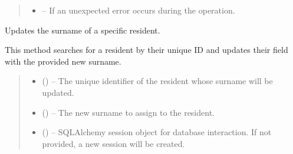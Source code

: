 \documentclass[letterpaper,10pt,english]{sphinxmanual}
\begin{document}
\begin{fulllineitems}
\begin{fulllineitems}
\begin{quote}
\begin{description}
\begin{itemize}
\item {} 
\sphinxAtStartPar
{} – If an unexpected error occurs during the operation.

\end{itemize}

\end{description}\end{quote}

\end{fulllineitems}


\begin{fulllineitems}
\label{\detokenize{app.controllers:app.controllers.resident_controller.ResidentController.updateResidentSurname}}
\pysigstartsignatures
\pysiglinewithargsret
{}
{\sphinxparamcomma {}\sphinxparamcomma {}}
{}
\pysigstopsignatures
\sphinxAtStartPar
Updates the surname of a specific resident.

\sphinxAtStartPar
This method searches for a resident by their unique ID and updates their  field
with the provided new surname.
\begin{quote}\begin{description}
\begin{itemize}
\item {} 
\sphinxAtStartPar
{} () – The unique identifier of the resident whose surname will be updated.

\item {} 
\sphinxAtStartPar
{} () – The new surname to assign to the resident.

\item {} 
\sphinxAtStartPar
{} (\sphinxstyleliteralemphasis{\sphinxupquote{, }}) – SQLAlchemy session object for database interaction.
If not provided, a new session will be created.


\end{itemize}
\end{description}
\end{quote}
\end{fulllineitems}
\end{fulllineitems}
\end{document}
